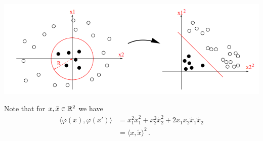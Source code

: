 \documentclass[xcolor={usenames,dvipsnames}]{beamer}
\begin{document}
%
%

\begin{frame}

 \begin{centering}
\includegraphics[scale=0.6]{polynomial_kernel.png}
\end{centering}
 
 Note that for $x, \tilde x \in \mathbb{R}^2$ we have
  \begin{align*}
    \langle{\varphi(x), \varphi(x')} \rangle &=x_1^2\tilde x_1^2 + x_2^2\tilde x_2^2+ 2 x_1x_2\tilde x_1 \tilde x_2 \\
    & = \langle {x, \tilde x} \rangle^2\,.
  \end{align*}

  \end{frame}
\end{document}
